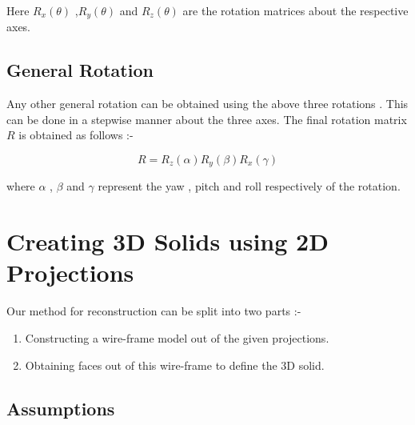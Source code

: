 \documentclass[12pt,a4paper]{article}
\begin{document}
Here $R_x(\theta)$ ,$R_y(\theta)$ and $R_z(\theta)$ are the rotation matrices about the respective axes.

\subsection{General Rotation}

Any other general rotation can be obtained using the above three rotations . This can be done in a stepwise
manner about the three axes. The final rotation matrix $R$ is obtained as follows :-

\begin{equation}
    R= R_z(\alpha)R_y(\beta)R_x(\gamma)
\end{equation}

where $\alpha$ , $\beta$ and $\gamma$ represent the yaw , pitch and roll respectively of the rotation.

\section{Creating 3D Solids using 2D Projections}

Our method for reconstruction can be split into two parts :-
\begin{enumerate}
    \item Constructing a wire-frame model out of the given projections.
    \item Obtaining faces out of this wire-frame to define the 3D solid.
\end{enumerate}


\subsection{Assumptions}
\end{document}
